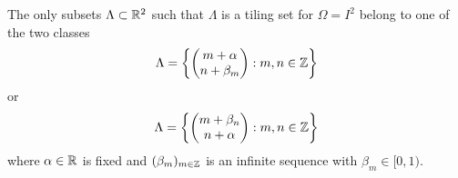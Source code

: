 \documentclass[../thesis.tex]{subfiles}
\begin{document}
\begin{theorem}\label{thrm:class_all_tiling_2d}  %
    The only subsets $\Lambda \subset \mathbb{R}^2$ such that $\Lambda$ is a tiling set for $\Omega = I^2$ belong to one of the two classes
    \begin{equation}\label{eq:2d_all_shift_class_1_tiling}
        \Lambda = \left\{
            \begin{pmatrix}
            m + \alpha \\
            n + \beta_m
            \end{pmatrix} : m,n \in  \mathbb{Z}
            \right\}
    \end{equation}
    or
    \begin{equation}\label{eq:2d_all_shift_class_2_tiling}
        \Lambda = \left\{
            \begin{pmatrix}
            m + \beta_n\\
            n + \alpha
            \end{pmatrix} : m,n \in  \mathbb{Z}
            \right\}
    \end{equation}
    where $\alpha \in \mathbb{R}$ is fixed and $(\beta_m)_{m\in \mathbb{Z}}$ is an infinite sequence with $\beta_m \in [0,1)$.
\end{theorem}
\end{document}
